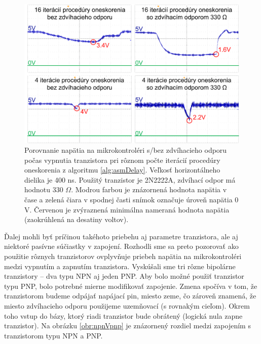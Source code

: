 \begin{figure}
    \centerline{\includegraphics[width=1\textwidth]{images/vccAnalysis.png}}
    \caption[Porovnanie napätia na mikrokontroléri s/bez zdvíhacieho odporu]{Porovnanie napätia na mikrokontroléri s/bez zdvíhacieho odporu počas vypnutia tranzistora pri rôznom počte iterácií procedúry oneskorenia z algoritmu \ref{alg:asmDelay}. Veľkosť horizontálneho dielika je 400 ns. Použitý tranzistor je 2N2222A, zdvíhací odpor má hodnotu 330 $\Omega$. Modrou farbou je znázornená hodnota napätia v čase a zelená čiara v spodnej časti snímok označuje úroveň napätia 0 V. Červenou je zvýraznená minimálna nameraná hodnota napätia (zaokrúhlená na desatiny voltov).}
    \label{obr:vccAnalysis}
\end{figure}

Ďalej mohli byť príčinou takéhoto priebehu aj parametre tranzistora, ale aj niektoré pasívne súčiastky v zapojení. Rozhodli sme sa preto pozorovať ako použitie rôznych tranzistorov ovplyvňuje priebeh napätia na mikrokontroléri medzi vypnutím a zapnutím tranzistora. Vyskúšali sme tri rôzne bipolárne tranzistory -- dva typu NPN aj jeden PNP. Aby bolo možné použiť tranzistor typu PNP, bolo potrebné mierne modifikovať zapojenie. Zmena spočíva v tom, že tranzistorom budeme odpájať napájací pin, miesto zeme, čo zároveň znamená, že miesto zdvíhacieho odporu použijeme uzemňovací (s rovnakým cieľom). Okrem toho vstup do bázy, ktorý riadi tranzistor bude obrátený (logická nula zapne tranzistor). Na obrázku \ref{obr:npnVpnp} je znázornený rozdiel medzi zapojením s tranzistorom typu NPN a PNP.

